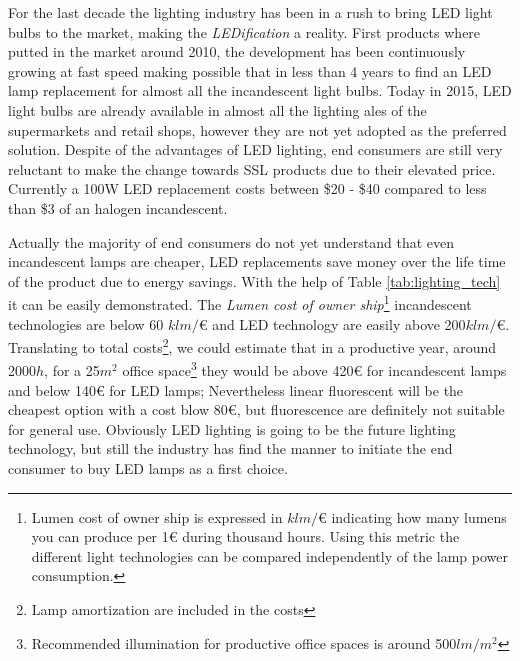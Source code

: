 For the last decade the lighting industry has been in a rush to bring LED light bulbs to the market, making the \emph{LEDification} a reality. First products where putted in the market around 2010, the development has been continuously growing at fast speed making possible that in less than 4 years to find an LED lamp replacement for almost all the incandescent light bulbs. Today in 2015, LED light bulbs are already available in almost all the lighting ales of the supermarkets and retail shops, however they are not yet adopted as the preferred solution. Despite of the advantages of LED lighting, end consumers are still very reluctant to make the change towards SSL products due to their elevated price. Currently a 100W LED replacement costs between \$20 - \$40 compared to less than \$3 of an halogen incandescent. 

Actually the majority of end consumers do not yet understand that even incandescent lamps are cheaper, LED replacements save money over the life time of the product due to energy savings. With the help of Table \ref{tab:lighting_tech} it can be easily demonstrated. The \emph{Lumen cost of owner ship}\footnote{Lumen cost of owner ship is expressed in $klm/$€ indicating how many lumens you can produce per 1€ during thousand hours. Using this metric the different light technologies can be compared independently of the lamp power consumption.} incandescent technologies are below 60 $klm/$€ and LED technology are easily above 200$klm/$€. Translating to total costs\footnote{Lamp amortization are included in the costs}, we could estimate that in a productive year, around 2000$h$, for a 25$ m^2 $  office space\footnote{Recommended illumination for productive office spaces is around 500$ lm/m^2 $ } they would be above 420€ for incandescent lamps and below 140€ for LED lamps; Nevertheless linear fluorescent will be the cheapest option with a cost blow 80€, but fluorescence are definitely not suitable for general use. Obviously LED lighting is going to be the future lighting technology, but still the industry has find the manner to initiate the end consumer to buy LED lamps as a first choice.


